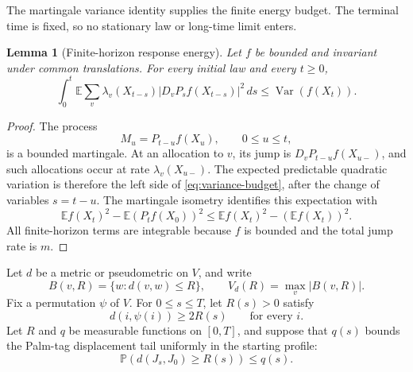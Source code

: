 \documentclass[11pt]{article}
\newtheorem{lemma}[lemma]{Lemma}
\theoremstyle{remark}
\newcommand{\E}{\mathbb{E}}
\newcommand{\Pp}{\mathbb{P}}
\newcommand{\Var}{\operatorname{Var}}
\begin{document}
The martingale variance identity supplies the finite energy budget. The terminal time is fixed, so no stationary law or long-time limit enters.

\begin{lemma}[Finite-horizon response energy]\label{lem:variance-budget}
Let $f$ be bounded and invariant under common translations. For every initial law and every $t\ge0$,
\[
 \int_0^t\E\sum_v\lambda_v(X_{t-s})
      |D_vP_sf(X_{t-s})|^2\,ds
 \le \Var(f(X_t)).
 \tag{5.1}\label{eq:variance-budget}
\]
\end{lemma}

\begin{proof}
The process
\[
 M_u=P_{t-u}f(X_u),\qquad 0\le u\le t,
\]
is a bounded martingale. At an allocation to $v$, its jump is $D_vP_{t-u}f(X_{u-})$, and such allocations occur at rate $\lambda_v(X_{u-})$. The expected predictable quadratic variation is therefore the left side of \eqref{eq:variance-budget}, after the change of variables $s=t-u$. The martingale isometry identifies this expectation with
\[
 \E f(X_t)^2-\E(P_tf(X_0))^2
 \le \E f(X_t)^2-(\E f(X_t))^2.
\]
All finite-horizon terms are integrable because $f$ is bounded and the total jump rate is $m$.
\end{proof}

Let $d$ be a metric or pseudometric on $V$, and write
\[
 B(v,R)=\{w:d(v,w)\le R\},
 \qquad
 V_d(R)=\max_v|B(v,R)|.
\]
Fix a permutation $\psi$ of $V$. For $0\le s\le T$, let $R(s)>0$ satisfy
\[
 d(i,\psi(i))\ge2R(s)
 \qquad\text{for every }i.
 \tag{5.2}\label{eq:separation}
\]
Let $R$ and $q$ be measurable functions on $[0,T]$, and suppose that $q(s)$ bounds the Palm-tag displacement tail uniformly in the starting profile:
\[
 \Pp(d(J_s,J_0)\ge R(s))\le q(s).
 \tag{5.3}\label{eq:tail-envelope}
\]
\end{document}
